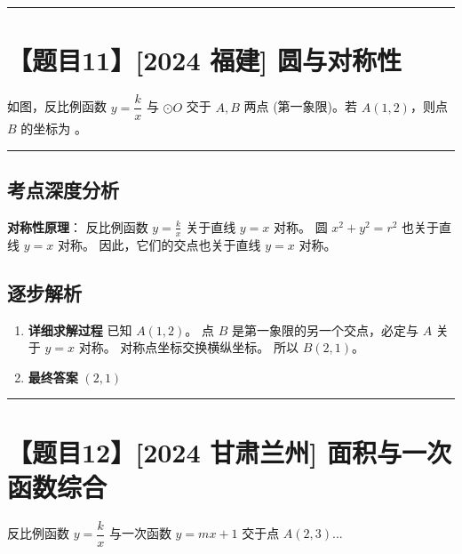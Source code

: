 \documentclass[UTF8]{ctexart}
\newenvironment{redenv}{\color{red}}{}
\newenvironment{detailedanalysis}{%
    \color{red}
    \begin{enumerate}[label=\textbf{第\arabic*步：}, leftmargin=*, align=left, itemsep=1.5ex]
}{%
    \end{enumerate}
}
\newenvironment{conceptbox}{%
    \begin{tcolorbox}[colback=red!5, colframe=red!50!black, title=概念解析, fonttitle=\bfseries]
}{%
    \end{tcolorbox}
}
\newcommand{\problemrule}{\noindent\rule{\textwidth}{1.5pt}\vspace{-0.8em}}
\newcommand{\analysisrule}{\noindent\rule{\textwidth}{0.8pt}\vspace{-0.8em}}
\begin{document}
\problemrule
\section*{【题目11】[2024 福建] 圆与对称性}
如图，反比例函数 $y=\dfrac{k}{x}$ 与 $\odot O$ 交于 $A, B$ 两点 (第一象限)。若 $A(1,2)$，则点 $B$ 的坐标为 \underline{\hspace{2cm}}。

\begin{redenv}
\analysisrule
\subsection*{考点深度分析}
\begin{conceptbox}
\textbf{对称性原理}：
反比例函数 $y=\frac{k}{x}$ 关于直线 $y=x$ 对称。
圆 $x^2+y^2=r^2$ 也关于直线 $y=x$ 对称。
因此，它们的交点也关于直线 $y=x$ 对称。
\end{conceptbox}

\subsection*{逐步解析}
\begin{detailedanalysis}
\item \textbf{详细求解过程}
已知 $A(1, 2)$。
点 $B$ 是第一象限的另一个交点，必定与 $A$ 关于 $y=x$ 对称。
对称点坐标交换横纵坐标。
所以 $B(2, 1)$。

\item \textbf{最终答案}
\textbf{$(2, 1)$}
\end{detailedanalysis}
\end{redenv}

\problemrule
\section*{【题目12】[2024 甘肃兰州] 面积与一次函数综合}
反比例函数 $y=\dfrac{k}{x}$ 与一次函数 $y=mx+1$ 交于点 $A(2,3)$...
\end{document}
